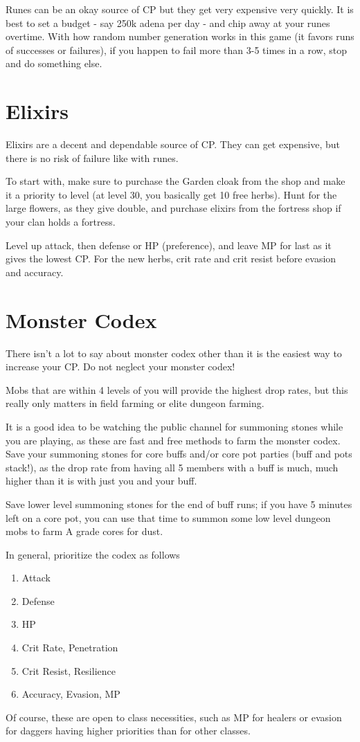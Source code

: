 \documentclass[]{article}
\begin{document}
Runes can be an okay source of CP but they get very expensive very quickly.
It is best to set a budget - say 250k adena per day - and chip away at your runes overtime.
With how random number generation works in this game (it favors runs of successes or failures), if you happen to fail more than 3-5 times in a row, stop and do something else.


\section{Elixirs}

Elixirs are a decent and dependable source of CP.
They can get expensive, but there is no risk of failure like with runes.

To start with, make sure to purchase the Garden cloak from the shop and make it a priority to level (at level 30, you basically get 10 free herbs).
Hunt for the large flowers, as they give double, and purchase elixirs from the fortress shop if your clan holds a fortress.

Level up attack, then defense or HP (preference), and leave MP for last as it gives the lowest CP.
For the new herbs, crit rate and crit resist before evasion and accuracy.

\section{Monster Codex}

There isn't a lot to say about monster codex other than it is the easiest way to increase your CP.
Do not neglect your monster codex!

Mobs that are within 4 levels of you will provide the highest drop rates, but this really only matters in field farming or elite dungeon farming.

It is a good idea to be watching the public channel for summoning stones while you are playing, as these are fast and free methods to farm the monster codex.
Save your summoning stones for core buffs and/or core pot parties (buff and pots stack!), as the drop rate from having all 5 members with a buff is much, much higher than it is with just you and your buff.

Save lower level summoning stones for the end of buff runs;
if you have 5 minutes left on a core pot, you can use that time to summon some low level dungeon mobs to farm A grade cores for dust.

In general, prioritize the codex as follows\\
\begin{enumerate}
	\item Attack
	\item Defense
	\item HP
	\item Crit Rate, Penetration
	\item Crit Resist, Resilience
	\item Accuracy, Evasion, MP

\end{enumerate}
Of course, these are open to class necessities, such as MP for healers or evasion for daggers having higher priorities than for other classes.
\end{document}
